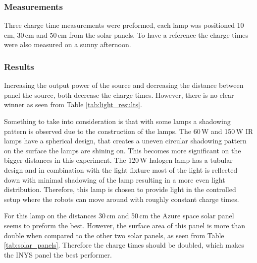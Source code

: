 \subsubsection{Measurements}
Three charge time measurements were preformed, each lamp was positioned 10\,cm, 30\,cm and 50\,cm from the solar panels.
To have a reference the charge times were also measured on a sunny afternoon. 

\subsubsection{Results}

Increasing the output power of the source and decreasing the distance between panel the source, both decrease the charge times.
However, there is no clear winner as seen from Table \ref{tab:light_results}.

Something to take into consideration is that with some lamps a shadowing pattern is observed due to the construction of the lamps.
The 60\,W and 150\,W IR lamps have a spherical design, that creates a uneven circular shadowing pattern on the surface the lamps are shining on. 
This becomes more significant on the bigger distances in this experiment.
The 120\,W halogen lamp has a tubular design and in combination with the light fixture most of the light is reflected down with minimal shadowing of the lamp resulting in a more even light distribution.
Therefore, this lamp is chosen to provide light in the controlled setup where the robots can move around with roughly constant charge times.

For this lamp on the distances 30\,cm and 50\,cm the Azure space solar panel seems to preform the best.
However, the surface area of this panel is more than double when compared to the other two solar panels, as seen from Table \ref{tab:solar_panels}.
Therefore the charge times should be doubled, which makes the INYS panel the best performer.


